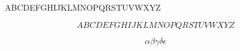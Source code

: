 \documentclass{minimal}
\begin{document}
ABCDEFGHIJKLMNOPQRSTUVWXYZ

\[ ABCDEFGHIJKLMNOPQRSTUVWXYZ \]

\[ \alpha\beta\gamma\delta\epsilon \]
\end{document}
